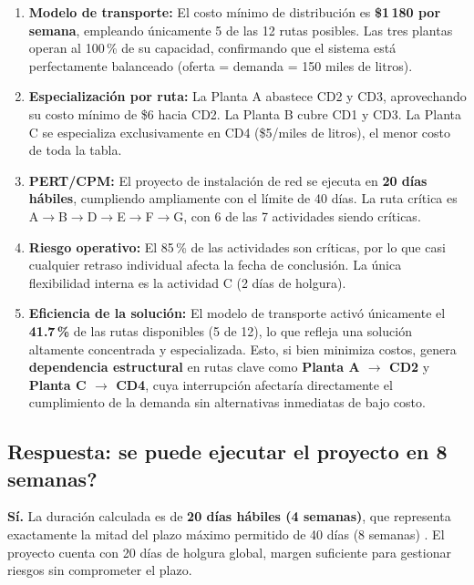 \documentclass[12pt,a4paper]{article}
\begin{document}
\begin{enumerate}
  \item \textbf{Modelo de transporte:} El costo m\'{i}nimo de distribuci\'{o}n es
  \textbf{\$1\,180 por semana}, empleando \'{u}nicamente 5 de las 12 rutas posibles.
  Las tres plantas operan al 100\,\% de su capacidad, confirmando que el sistema
  est\'{a} perfectamente balanceado (oferta = demanda = 150 miles de litros).

  \item \textbf{Especializaci\'{o}n por ruta:} La Planta A abastece CD2 y CD3,
  aprovechando su costo m\'{i}nimo de \$6 hacia CD2. La Planta B cubre CD1 y CD3.
  La Planta C se especializa exclusivamente en CD4 (\$5/miles de litros),
  el menor costo de toda la tabla.

  \item \textbf{PERT/CPM:} El proyecto de instalaci\'{o}n de red se ejecuta en
  \textbf{20 d\'{i}as h\'{a}biles}, cumpliendo ampliamente con el l\'{i}mite de 40 d\'{i}as.
  La ruta cr\'{i}tica es A$\to$B$\to$D$\to$E$\to$F$\to$G, con 6 de las 
  7 actividades siendo cr\'{i}ticas.

  \item \textbf{Riesgo operativo:} El 85\,\% de las actividades son cr\'{i}ticas,
  por lo que casi cualquier retraso individual afecta la fecha de conclusi\'{o}n.
  La \'{u}nica flexibilidad interna es la actividad C (2 d\'{i}as de holgura).

  \item\noindent\textbf{Eficiencia de la soluci\'{o}n:} El modelo de transporte activ\'{o} 
  \'{u}nicamente el \textbf{41.7\,\%} de las rutas disponibles (5 de 12), lo que refleja 
  una soluci\'{o}n altamente concentrada y especializada. Esto, si bien 
  minimiza costos, genera \textbf{dependencia estructural} en rutas clave como 
  \textbf{Planta A $\to$ CD2} y \textbf{Planta C $\to$ CD4}, cuya interrupci\'{o}n 
  afectar\'{i}a directamente el cumplimiento de la demanda sin alternativas inmediatas 
  de bajo costo.
\end{enumerate}

\subsection{Respuesta: \textquestiondown se puede ejecutar el proyecto en 8 semanas?}

\textbf{S\'{i}.} La duraci\'{o}n calculada es de \textbf{20 d\'{i}as h\'{a}biles (4 semanas)},
que representa exactamente la mitad del plazo m\'{a}ximo permitido de 40 d\'{i}as (8 semanas) 
\cite{render2012}. El proyecto cuenta con 20 d\'{i}as de holgura global, margen suficiente 
para gestionar riesgos sin comprometer el plazo.
\end{document}
